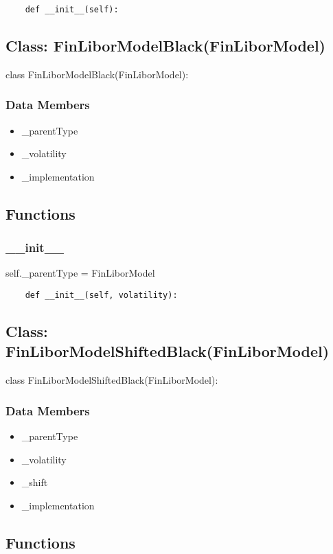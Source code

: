 \documentclass[twoside,11pt]{book}
\begin{document}
\begin{lstlisting}
    def __init__(self):
\end{lstlisting}

\subsection*{Class: FinLiborModelBlack(FinLiborModel)}
class FinLiborModelBlack(FinLiborModel): 

\subsubsection*{Data Members}
\begin{itemize}
\item{\_parentType}
\item{\_volatility}
\item{\_implementation}
\end{itemize}

\subsection*{Functions}

\subsubsection*{{\bf \_\_init\_\_}}
self.\_parentType = FinLiborModel 

\begin{lstlisting}
    def __init__(self, volatility):
\end{lstlisting}

\subsection*{Class: FinLiborModelShiftedBlack(FinLiborModel)}
class FinLiborModelShiftedBlack(FinLiborModel): 

\subsubsection*{Data Members}
\begin{itemize}
\item{\_parentType}
\item{\_volatility}
\item{\_shift}
\item{\_implementation}
\end{itemize}

\subsection*{Functions}
\end{document}
